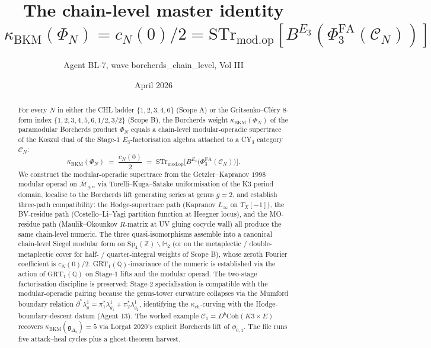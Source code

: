 \documentclass[11pt]{amsart}
\providecommand{\Z}{\mathbb{Z}}
\providecommand{\Q}{\mathbb{Q}}
\providecommand{\cC}{\mathcal{C}}
\providecommand{\fg}{\mathfrak{g}}
\providecommand{\GRT}{\mathrm{GRT}}
\providecommand{\PhiFA}{\Phi^{\mathrm{FA}}}
\providecommand{\Coh}{\mathrm{Coh}}
\providecommand{\STr}{\mathrm{STr}}
\providecommand{\modop}{\mathrm{mod.op}}
\providecommand{\kBKM}{\kappa_{\mathrm{BKM}}}
\providecommand{\kch}{\kappa_{\mathrm{ch}}}
\begin{document}
\title{The chain-level master identity\\
$\kBKM(\Phi_N) = c_N(0)/2 = \STr_{\modop}[B^{E_3}(\PhiFA_3(\cC_N))]$}
\author{Agent BL-7, wave borcherds\_chain\_level, Vol III}
\date{April 2026}
\maketitle

\begin{abstract}
For every $N$ in either the CHL ladder $\{1,2,3,4,6\}$ (Scope A) or
the Gritsenko--Cl\'ery $8$-form index $\{1,2,3,4,5,6,1/2,3/2\}$
(Scope B), the Borcherds weight $\kBKM(\Phi_N)$ of the paramodular
Borcherds product $\Phi_N$ equals a chain-level modular-operadic
supertrace of the Koszul dual of the Stage-$1$ $E_3$-factorisation
algebra attached to a CY$_3$ category $\cC_N$:
\[
 \kBKM(\Phi_N) \;=\; \frac{c_N(0)}{2}
 \;=\; \STr_{\modop}\bigl[B^{E_3}\bigl(\PhiFA_3(\cC_N)\bigr)\bigr].
\]
We construct the modular-operadic supertrace from the Getzler--Kapranov
$1998$ modular operad on $\overline{\mathcal M}_{g,n}$ via
Torelli--Kuga--Satake uniformisation of the K3 period domain, localise
to the Borcherds lift generating series at genus $g = 2$, and establish
three-path compatibility: the Hodge-supertrace path (Kapranov
$L_\infty$ on $T_X[-1]$), the BV-residue path (Costello--Li--Yagi
partition function at Heegner locus), and the MO-residue path
(Maulik--Okounkov $R$-matrix at UV gluing cocycle wall) all produce the
same chain-level numeric. The three quasi-isomorphisms assemble into a
canonical chain-level Siegel modular form on
$\mathrm{Sp}_4(\Z)\backslash \mathbb{H}_2$ (or on the metaplectic /
double-metaplectic cover for half- / quarter-integral weights of
Scope B), whose zeroth Fourier coefficient is $c_N(0)/2$.
GRT$_1(\Q)$-invariance of the numeric is established via the action
of $\GRT_1(\Q)$ on Stage-$1$ lifts and the modular operad. The
two-stage factorisation discipline is preserved: Stage-$2$
specialisation is compatible with the modular-operadic pairing because
the genus-tower curvature collapses via the Mumford boundary relation
$\partial^* \lambda_g^1 = \pi_1^* \lambda_{g_1}^1 + \pi_2^* \lambda_{g_2}^1$,
identifying the $\kch$-curving with the Hodge-boundary-descent datum
(Agent 13). The worked example $\cC_1 = D^b\Coh(K3 \times E)$ recovers
$\kBKM(\fg_{\Delta_5}) = 5$ via Lorgat $2020$'s explicit Borcherds
lift of $\phi_{0,1}$. The file runs five attack--heal cycles plus a
ghost-theorem harvest.
\end{abstract}
\end{document}
